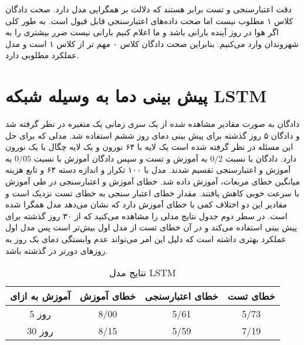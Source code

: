 \documentclass{article}
\begin{document}
	دقت اعتبارسنجی و تست برابر هستند که دلالت بر همگرایی مدل دارد. صحت دادگان کلاس ۱ مطلوب نیست اما صحت داده‌های اعتبارسنجی قابل قبول است. به طور کلی اگر هوا در روز آینده بارانی باشد و ما اعلام کنیم بارانی نیست ضرر بیشتری را به شهروندان وارد می‌کنیم. بنابراین صحت دادگان کلاس ۰ مهم تر از کلاس ۱ است و مدل عملکرد مطلوبی دارد. 
	\section{پیش بینی دما به وسیله شبکه LSTM}
	دادگان به صورت مقادیر مشاهده شده از یک سری زمانی یک متغیره در نظر گرفته شد و دادگان ۵ روز گذشته برای پیش بینی دمای روز ششم استفاده شد. مدلی که برای حل این مسئله در نظر گرفته شده است یک لایه 
	با ۶۴ نورون و یک لایه چگال 
	 با یک نورون دارد.
	 دادگان با نسبت 
	 $0/2$
	 به آموزش و تست و سپس دادگان آموزش با نسبت 
	 $0/05$
	 به آموزش و اعتبارسنجی تقسیم شدند. مدل با ۱۰۰ تکرار
	 و اندازه دسته 
	 ۶۴ و تابع هزینه میانگین خطای مربعات، آموزش داده شد. خطای آموزش و اعتبارسنجی در طی آموزش با سرعت خوبی کاهش یافتند. مقدار خطای اعتبار سنجی به خطای تست نزدیک است و مقادیر این دو اختلاف کمی با خطای آموزش دارد که نشان می‌دهد مدل همگرا شده است. در سطر دوم جدول نتایج مدلی را مشاهده می‌کنید که از ۳۰ روز گذشته برای پیش بینی استفاده می‌کند و در آن خطای تست از مدل اول بیش‌تر است پس مدل اول عملکرد بهتری داشته است که دلیل این امر می‌تواند عدم وابستگی دمای یک روز به روز‌های دورتر در گذشته باشد.
	 \begin{table}[h]
	 	\begin{center}
	 	\begin{tabular}{|c|c|c|c|}
	 		\hline
	 	 آموزش به ازای & خطای آموزش & خطای اعتبارسنجی & خطای تست \\
	 		\hline
	 		5 روز & 8/00 & 5/61 & 5/73 \\
	 		\hline
	 		30 روز & 8/15 & 5/59 & 7/19 \\
	 		\hline
	 	\end{tabular}
 	\caption{نتایج مدل LSTM }
 	\end{center}
	 \end{table} 
\end{document}
